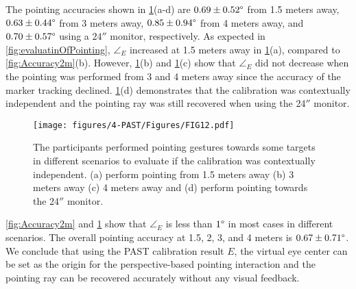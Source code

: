The pointing accuracies shown in \figurename{ \ref{fig:Accuracy}(a-d)} are $0.69\pm0.52\degree$ from 1.5 meters away, $0.63\pm0.44\degree$ from 3 meters away, $0.85\pm0.94\degree$ from 4 meters away, and $0.70\pm0.57\degree$ using a $24''$ monitor, respectively. 
As expected in \figurename{ \ref{fig:evaluatinOfPointing}},  ${\angle}_{E}$ increased at 1.5 meters away in \figurename{ \ref{fig:Accuracy}(a)}, compared to \figurename{ \ref{fig:Accuracy2m}(b)}. However, \figurename{ \ref{fig:Accuracy}(b) and \ref{fig:Accuracy}(c)} show that ${\angle}_{E}$ did not decrease when the pointing was performed from 3 and 4 meters away since the accuracy of the marker tracking declined. \figurename{ \ref{fig:Accuracy}(d)} demonstrates that the calibration was contextually independent and the pointing ray was still recovered when using the 24$''$ monitor. 
\begin{figure} 
	\centering
	\texttt{[image: figures/4-PAST/Figures/FIG12.pdf]}
	\caption{The participants performed pointing gestures towards some targets in different scenarios to evaluate if the calibration was contextually independent. (a) perform pointing from 1.5 meters away (b) 3 meters away (c) 4 meters away and (d) perform pointing towards the 24$''$ monitor.}
	\label{fig:Accuracy}
\end{figure}

\figurename{ \ref{fig:Accuracy2m}} and \figurename{ \ref{fig:Accuracy}} show that ${\angle}_{E}$ is less than $1\degree$ in most cases in different scenarios. The overall pointing accuracy at 1.5, 2, 3, and 4 meters is $0.67\pm0.71\degree$. We conclude that using the PAST calibration result $E$, the virtual eye center can be set as the origin for the perspective-based pointing interaction and the pointing ray can be recovered accurately without any visual feedback.

